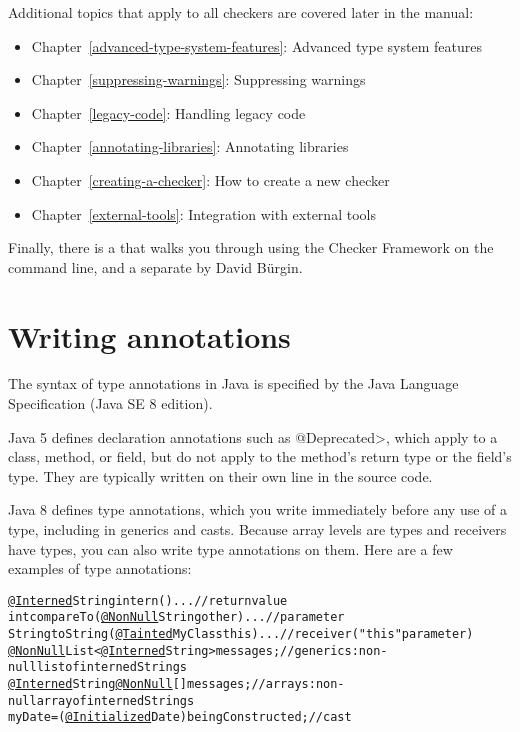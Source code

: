 Additional topics that apply to all checkers are covered later in the manual:
\begin{itemize}
\item Chapter~\ref{advanced-type-system-features}: Advanced type system features
\item Chapter~\ref{suppressing-warnings}: Suppressing warnings
\item Chapter~\ref{legacy-code}: Handling legacy code
\item Chapter~\ref{annotating-libraries}: Annotating libraries
\item Chapter~\ref{creating-a-checker}: How to create a new checker
\item Chapter~\ref{external-tools}: Integration with external tools
\end{itemize}


Finally, there is a
that walks you through using the Checker Framework on the
command line, and a separate
 by David B\"urgin.



\section{Writing annotations\label{writing-annotations}}

The syntax of type annotations in Java is specified by
the Java Language Specification (Java SE 8 edition).

Java 5 defines declaration annotations such as \<@Deprecated>, which apply
to a class, method, or field, but do not apply to the method's return type
or the field's type.  They are typically written on their own line in the
source code.

Java 8 defines type annotations, which you write immediately before any
use of a type, including in generics and casts.  Because array levels are
types and receivers have types, you can also write type annotations on
them.  Here are a few examples of type annotations:

\begin{smaller}
\begin{alltt}
  \underline{@Interned} String intern() \ttlcb{} ... \ttrcb{}               // return value
  int compareTo(\underline{@NonNull} String other) \ttlcb{} ... \ttrcb{}    // parameter
  String toString(\underline{@Tainted} MyClass this) \ttlcb{} ... \ttrcb{}  // receiver ("this" parameter)
  \underline{@NonNull} List<\underline{@Interned} String> messages;       // generics:  non-null list of interned Strings
  \underline{@Interned} String \underline{@NonNull} [] messages;          // arrays:  non-null array of interned Strings
  myDate = (\underline{@Initialized} Date) beingConstructed;  // cast
\end{alltt}
\end{smaller}


